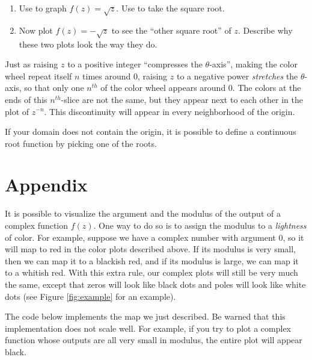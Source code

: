 \begin{problem}
\begin{enumerate}
\item Use  to graph $f(z) = \sqrt{z}$.
Use  to take the square root.
\item Now plot $f(z) = -\sqrt{z}$ to see the ``other square root'' of $z$.
Describe why these two plots look the way they do.
\end{enumerate}
\end{problem}

Just as raising $z$ to a positive integer ``compresses the $\theta$-axis'', making the color wheel repeat itself $n$ times around 0, raising $z$ to a negative power \emph{stretches} the $\theta$-axis, so that only one $n^{th}$ of the color wheel appears around 0.
The colors at the ends of this $n^{th}$-slice are not the same, but they appear next to each other in the plot of $z^{-n}$.
This discontinuity will appear in every neighborhood of the origin.


If your domain does not contain the origin, it is possible to define a continuous root function by picking one of the roots.


\section*{Appendix}
It is possible to visualize the argument and the modulus of the output of a complex function $f(z)$.
One way to do so is to assign the modulus to a \emph{lightness} of color.
For example, suppose we have a complex number with argument 0, so it will map to red in the color plots described above.
If its modulus is very small, then we can map it to a blackish red, and if its modulus is large, we can map it to a whitish red.
With this extra rule, our complex plots will still be very much the same, except that zeros will look like black dots and poles will look like white dots (see Figure \ref{fig:example} for an example).

The code below implements the map we just described.
Be warned that this implementation does not scale well.
For example, if you try to plot a complex function whose outputs are all very small in modulus, the entire plot will appear black.


